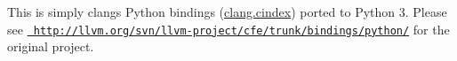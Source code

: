 This is simply clang\textquotesingle{}s Python bindings (\mbox{\hyperlink{namespaceclang_1_1cindex}{clang.\+cindex}}) ported to Python 3. Please see \href{http://llvm.org/svn/llvm-project/cfe/trunk/bindings/python/}{\texttt{ http\+://llvm.\+org/svn/llvm-\/project/cfe/trunk/bindings/python/}} for the original project. 
